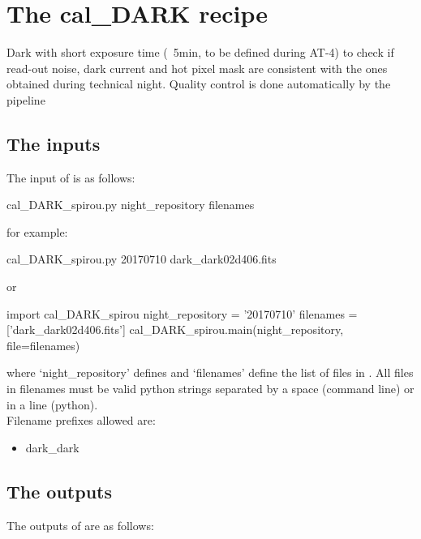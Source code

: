 \section{The cal\_DARK recipe}
\label{ch:the_recipes:cal_DARK_spirou}

Dark with short exposure time (~5min, to be defined during AT-4) to check if read-out noise, dark current and hot pixel mask are consistent with the ones obtained during technical night. Quality control is done automatically by the pipeline \\


\subsection{The inputs}
The input of \calDARK is as follows:
\begin{cmdbox}
cal_DARK_spirou.py  night_repository  filenames
\end{cmdbox}
\noindent for example:
\begin{cmdbox}[title={example}]
cal_DARK_spirou.py 20170710 dark_dark02d406.fits
\end{cmdbox}
\noindent or
\begin{pythonbox}
import cal_DARK_spirou
night_repository = '20170710'
filenames = ['dark_dark02d406.fits']
cal_DARK_spirou.main(night_repository, file=filenames)
\end{pythonbox}

\noindent where `night\_repository' defines \argnightname and `filenames' define the list of files in \argfilenames. All files in filenames must be valid python strings separated by a space (command line) or in a line (python). \\

\noindent Filename prefixes allowed are:
\begin{itemize}
	\item dark\_dark
\end{itemize}

\subsection{The outputs}
The outputs of \calDARK are as follows:


